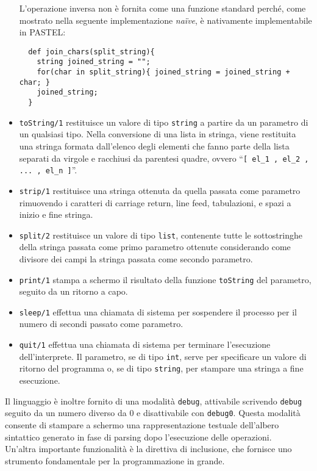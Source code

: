 \documentclass[10pt]{article}
\begin{document}
\begin{itemize}
L'operazione inversa non è fornita come una funzione standard perché, come mostrato nella seguente implementazione \textit{naïve}, è nativamente implementabile in PASTEL:
\begin{verbatim}
  def join_chars(split_string){
    string joined_string = "";
    for(char in split_string){ joined_string = joined_string + char; }
    joined_string;
  }
\end{verbatim}
\item \texttt{toString/1} restituisce un valore di tipo \texttt{string} a partire da un parametro di un qualsiasi tipo. Nella conversione di una lista in stringa, viene restituita una stringa formata dall'elenco degli elementi che fanno parte della lista separati da virgole e racchiusi da parentesi quadre, ovvero ``\texttt{[ el\_1 , el\_2 , ... , el\_n ]}''.
\item \texttt{strip/1} restituisce una stringa ottenuta da quella passata come parametro rimuovendo i caratteri di carriage return, line feed, tabulazioni, e spazi a inizio e fine stringa.
\item \texttt{split/2} restituisce un valore di tipo \texttt{list}, contenente tutte le sottostringhe della stringa passata come primo parametro ottenute considerando come divisore dei campi la stringa passata come secondo parametro.
\item \texttt{print/1} stampa a schermo il risultato della funzione \texttt{toString} del parametro, seguito da un ritorno a capo.
\item \texttt{sleep/1} effettua una chiamata di sistema per sospendere il processo per il numero di secondi passato come parametro.
\item \texttt{quit/1} effettua una chiamata di sistema per terminare l'esecuzione dell'interprete. Il parametro, se di tipo \texttt{int}, serve per specificare un valore di ritorno del programma o, se di tipo \texttt{string}, per stampare una stringa a fine esecuzione.
\end{itemize}

Il linguaggio è inoltre fornito di una modalità \texttt{debug}, attivabile scrivendo \texttt{debug} seguito da un numero diverso da 0 e disattivabile con \texttt{debug0}. Questa modalità consente di stampare a schermo una rappresentazione testuale dell'albero sintattico generato in fase di parsing dopo l'esecuzione delle operazioni. \\
Un'altra importante funzionalità è la direttiva di inclusione, che fornisce uno strumento fondamentale per la programmazione in grande.
\end{document}
